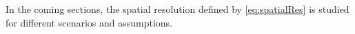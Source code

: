 In the coming sections, the spatial resolution defined by
\cref{eq:spatialRes} is studied for different scenarios and
assumptions.

      
      
      


